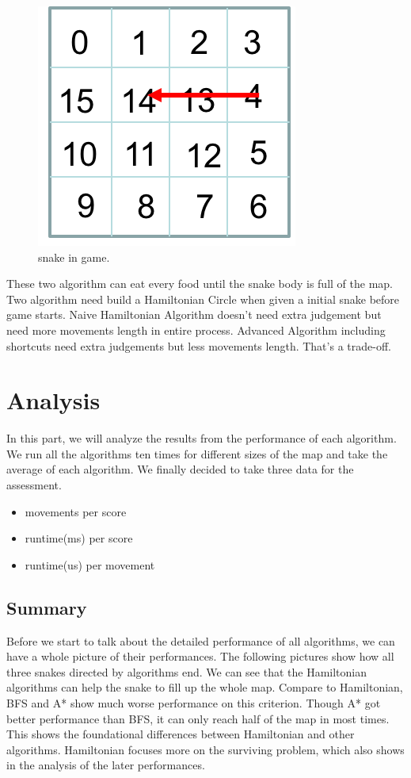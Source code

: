 \documentclass[12pt]{article}
\begin{document}
\begin{figure}[H]
\centering 
\includegraphics[scale = 0.8]{Picture3.png}
\caption{snake in game.}
\label{fig:figure4label}
\end{figure}

These two algorithm can eat every food until the snake body is full of the map. Two algorithm need build a Hamiltonian Circle when given a initial snake before game starts. Naive Hamiltonian Algorithm doesn't need extra judgement but need more movements length in entire process. Advanced Algorithm including shortcuts need extra judgements but less movements length. That's a trade-off.

\section{Analysis}

In this part, we will analyze the results from the performance of each algorithm. We run all the algorithms ten times for different sizes of the map and take the average of each algorithm. We finally decided to take three data for the assessment.
\begin{itemize}
    \item movements per score
    \item runtime(ms) per score
    \item runtime(us) per movement
\end{itemize}

\subsection{Summary}

Before we start to talk about the detailed performance of all algorithms, we can have a whole picture of their performances. The following pictures show how all three snakes directed by algorithms end. We can see that the Hamiltonian algorithms can help the snake to fill up the whole map. Compare to Hamiltonian, BFS and A* show much worse performance on this criterion. Though A* got better performance than BFS, it can only reach half of the map in most times. This shows the foundational differences between Hamiltonian and other algorithms. Hamiltonian focuses more on the surviving problem, which also shows in the analysis of the later performances.
\end{document}
